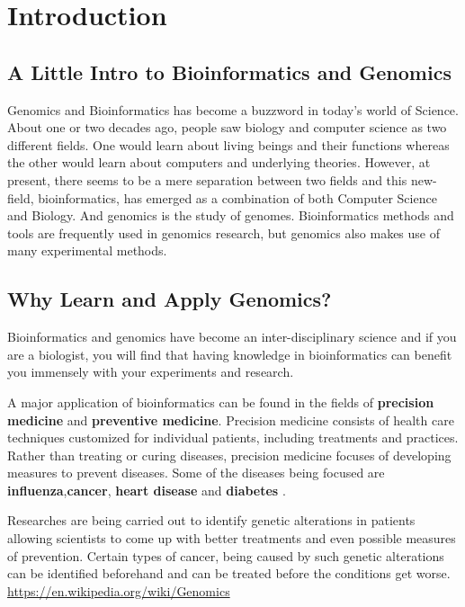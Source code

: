 \chapter{Introduction}\label{ch:ch1}

\section{A Little Intro to Bioinformatics and Genomics}
Genomics and Bioinformatics has become a buzzword in today's world of Science. About one or two decades ago, people saw biology and computer science as two different fields. One would learn about living beings and their functions whereas the other would learn about computers and underlying theories. However, at present, there seems to be a mere separation between two fields and this new-field, bioinformatics, has emerged as a combination of both Computer Science and Biology. And genomics is the study of genomes. Bioinformatics methods and tools are frequently used in genomics research, but genomics also makes use of many experimental methods\cite{ranganathan2018encyclopedia}. 

\section{Why Learn and Apply Genomics?} 
Bioinformatics and genomics have become an inter-disciplinary science and if you are a biologist, you will find that having knowledge in bioinformatics can benefit you immensely with your experiments and research.

A major application of bioinformatics can be found in the fields of \textbf{precision medicine}  and \textbf{preventive medicine}. Precision medicine consists of health care techniques customized for individual patients, including treatments and practices. Rather than treating or curing diseases, precision medicine focuses of developing measures to prevent diseases. Some of the diseases being focused are \textbf{influenza},\textbf{cancer}, \textbf{heart disease} and \textbf{diabetes} \cite{lowe2015genomic}.


Researches are being carried out to identify genetic alterations in patients allowing scientists to come up with better treatments and even possible measures of prevention. Certain types of cancer, being caused by such genetic alterations can be identified beforehand and can be treated before the conditions get worse. \url{https://en.wikipedia.org/wiki/Genomics}


